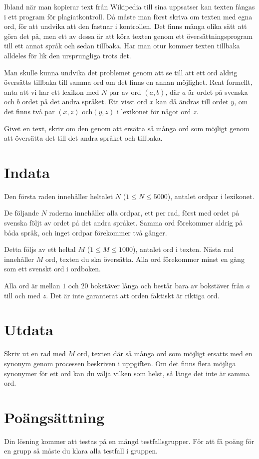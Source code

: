 Ibland när man kopierar text från Wikipedia till sina uppsatser kan texten fångas i ett program för plagiatkontroll.
Då måste man först skriva om texten med egna ord, för att undvika att den fastnar i kontrollen.
Det finns många olika sätt att göra det på, men ett av dessa är att köra texten genom ett översättningsprogram till ett annat språk och sedan tillbaka.
Har man otur kommer texten tillbaka alldeles för lik den ursprungliga trots det.

Man skulle kunna undvika det problemet genom att se till att ett ord aldrig översätts tillbaka till samma ord om det finns en annan möjlighet.
Rent formellt, anta att vi har ett lexikon med $N$ par av ord $(a, b)$, där $a$ är ordet på svenska och $b$ ordet på det andra språket.
Ett visst ord $x$ kan då ändras till ordet $y$, om det finns två par $(x, z)$ och$(y, z)$ i lexikonet för något ord $z$.

Givet en text, skriv om den genom att ersätta så många ord som möjligt genom att översätta det till det andra språket och tillbaka.

\section*{Indata}
Den första raden innehåller heltalet $N$ ($1 \le N \le 5000$), antalet ordpar i lexikonet.

De följande $N$ raderna innehåller alla ordpar, ett per rad, först med ordet på svenska följt av ordet på det andra språket.
Samma ord förekommer aldrig på båda språk, och inget ordpar förekommer två gånger.

Detta följs av ett heltal $M$ ($1 \le M \le 1000$), antalet ord i texten.
Nästa rad innehåller $M$ ord, texten du ska översätta.
Alla ord förekommer minst en gång som ett svenskt ord i ordboken.

Alla ord är mellan $1$ och $20$ bokstäver långa och består bara av bokstäver från $a$ till och med $z$.
Det är inte garanterat att orden faktiskt är riktiga ord.

\section*{Utdata}
Skriv ut en rad med $M$ ord, texten där så många ord som möjligt ersatts med en synonym genom processen beskriven i uppgiften.
Om det finns flera möjliga synonymer för ett ord kan du välja vilken som helst, så länge det inte är samma ord.

\section*{Poängsättning}
Din lösning kommer att testas på en mängd testfallsgrupper.
För att få poäng för en grupp så måste du klara alla testfall i gruppen.

